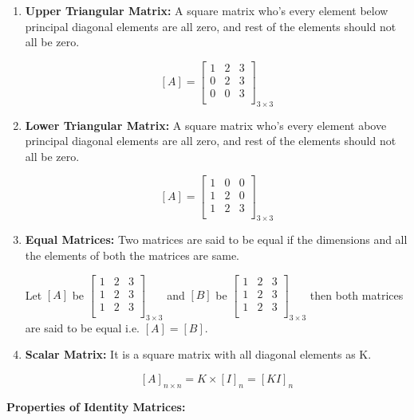 \begin{enumerate}
    \item \textbf{Upper Triangular Matrix:} A square matrix who's every element below principal diagonal elements are all zero, and rest of the elements should not all be zero.

    $$  [A] = \begin{bmatrix}
        1 & 2 & 3 \\
        0 & 2 & 3 \\
        0 & 0 & 3 \\
        \end{bmatrix}_{3 \times 3}
    $$

    \item \textbf{Lower Triangular Matrix:} A square matrix who's every element above principal diagonal elements are all zero, and rest of the elements should not all be zero.

    $$  [A] = \begin{bmatrix}
        1 & 0 & 0 \\
        1 & 2 & 0 \\
        1 & 2 & 3 \\
        \end{bmatrix}_{3 \times 3}
    $$

    \item \textbf{Equal Matrices:} Two matrices are said to be equal if the dimensions and all the elements of both the matrices are same.

    Let $[A]$ be $ \begin{bmatrix}
        1 & 2 & 3 \\
        1 & 2 & 3 \\
        1 & 2 & 3 \\
        \end{bmatrix}_{3 \times 3}
    $ and $[B]$ be $ \begin{bmatrix}
        1 & 2 & 3 \\
        1 & 2 & 3 \\
        1 & 2 & 3 \\
        \end{bmatrix}_{3 \times 3}
    $ then both matrices are said to be equal i.e. $[A] = [B]$.

    \item \textbf{Scalar Matrix:} It is a square matrix with all diagonal elements as K.

    $$ [A]_{n \times n} = K \times [I]_n = [KI]_n $$
\end{enumerate}

\textbf{Properties of Identity Matrices:}

